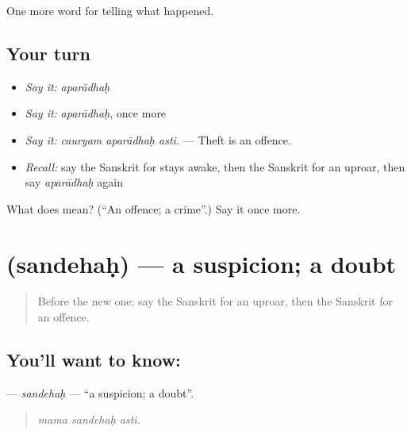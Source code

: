 \begin{grammarlens}[title={What you've built}]
One more word for telling what happened.
\end{grammarlens}

\subsection*{Your turn}
\begin{itemize}
\raggedright
  \item \emph{Say it:} \emph{aparādhaḥ}
  \item \emph{Say it:} \emph{aparādhaḥ}, once more
  \item \emph{Say it:} \emph{cauryam aparādhaḥ asti.} — Theft is an offence.
  \item \emph{Recall:} say the Sanskrit for stays awake, then the Sanskrit for an uproar, then say \emph{aparādhaḥ} again
\end{itemize}

\begin{tcolorbox}[breakable,colback=teal!4,colframe=teal!35!black,title={Before you move on}]
What does  mean? (\textquotedblleft{}An offence; a crime\textquotedblright{}.) Say it once more.
\end{tcolorbox}
\section[\texorpdfstring{\sk{सन्देहः} (sandehaḥ)}{सन्देहः (sandehaḥ)}]{ (sandehaḥ) — a suspicion; a doubt}

\label{lesson:SA-C288-sandehah}



\begin{quote}
Before the new one: say the Sanskrit for an uproar, then the Sanskrit for an offence.
\end{quote}

\subsection*{You'll want to know: }
\textbf{} — \emph{sandehaḥ} — \textquotedblleft{}a suspicion; a doubt\textquotedblright{}.

\begin{quote}
  
\end{quote}

\begin{quote}
\emph{mama sandehaḥ asti.}
\end{quote}

